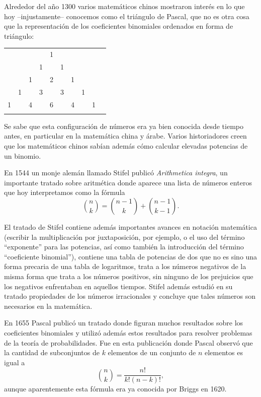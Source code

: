 Alrededor del
año 1300 varios matemáticos chinos mostraron interés en lo que hoy
--injustamente-- conocemos como el triángulo de Pascal, que no es otra cosa que
la representación de los coeficientes binomiales ordenados en forma de
triángulo: 

\begin{center}
\begin{tabular}{rccccccccc}
    &    &    &    &  1\\\noalign{\smallskip\smallskip}
    &    &    &  1 &    &  1\\\noalign{\smallskip\smallskip}
    &    &  1 &    &  2 &    &  1\\\noalign{\smallskip\smallskip}
    &  1 &    &  3 &    &  3 &    &  1\\\noalign{\smallskip\smallskip}
  1 &    &  4 &    &  6 &    &  4 &    &  1\\\noalign{\smallskip\smallskip}
\end{tabular}
\end{center}

Se sabe que esta configuración de números era ya bien conocida desde tiempo antes, en
particular en la matemática china y árabe. Varios historiadores creen que los
matemáticos chinos sabían además cómo calcular elevadas potencias de un binomio. 

En 1544 un monje alemán llamado Stifel publicó \emph{Arithmetica integra}, un
importante tratado sobre aritmética donde aparece una lista de números enteros
que hoy interpretamos como la fórmula
\[
	\binom{n}{k}=\binom{n-1}{k}+\binom{n-1}{k-1}.
\]

El tratado de Stifel contiene además importantes avances en 
notación matemática (escribir la multiplicación por juxtaposición, por ejemplo,
o el uso del término ``exponente'' para las potencias, así como también
la introducción del término ``coeficiente binomial''), contiene una tabla de
potencias de dos que no es sino una forma precaria de una tabla de logaritmos,
trata a los números negativos de la misma forma que trata a los números
positivos, sin ninguno de los prejuicios que los negativos enfrentaban en
aquellos tiempos. Stifel además estudió en su tratado propiedades de los
números irracionales y concluye que tales números son necesarios en la
matemática. 

En 1655 Pascal publicó un tratado donde figuran muchos resultados sobre los
coeficientes binomiales y  utilizó además estos resultados para resolver
problemas de la teoría de probabilidades. Fue en esta publicación donde Pascal
observó que la cantidad de subconjuntos de $k$ elementos de un conjunto de $n$
elementos es igual a 
\[
	\binom{n}{k}=\frac{n!}{k!(n-k)!},
\]
aunque aparentemente esta fórmula era ya conocida por Briggs en 1620.  

